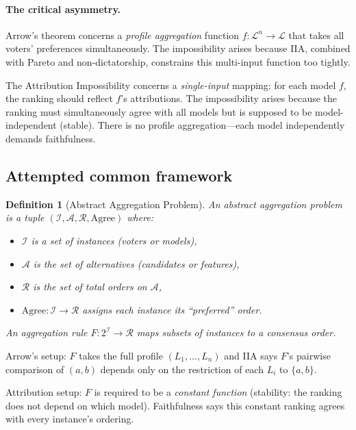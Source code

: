 \documentclass{article}
\newtheorem{definition}[theorem]{Definition}
\begin{document}
\paragraph{The critical asymmetry.}
Arrow's theorem concerns a \emph{profile aggregation} function
$f \colon \mathcal{L}^n \to \mathcal{L}$ that takes all voters'
preferences simultaneously. The impossibility arises because IIA,
combined with Pareto and non-dictatorship, constrains this multi-input
function too tightly.

The Attribution Impossibility concerns a \emph{single-input} mapping:
for each model $f$, the ranking should reflect $f$'s attributions.
The impossibility arises because the ranking must simultaneously
agree with all models but is supposed to be model-independent (stable).
There is no profile aggregation---each model independently demands
faithfulness.

\subsection{Attempted common framework}

\begin{definition}[Abstract Aggregation Problem]
An \emph{abstract aggregation problem} is a tuple
$(\mathcal{I}, \mathcal{A}, \mathcal{R}, \text{Agree})$ where:
\begin{itemize}
    \item $\mathcal{I}$ is a set of \emph{instances} (voters or models),
    \item $\mathcal{A}$ is the set of alternatives (candidates or features),
    \item $\mathcal{R}$ is the set of total orders on $\mathcal{A}$,
    \item $\text{Agree} \colon \mathcal{I} \to \mathcal{R}$ assigns each
      instance its ``preferred'' order.
\end{itemize}
An \emph{aggregation rule} $F \colon 2^{\mathcal{I}} \to \mathcal{R}$
maps subsets of instances to a consensus order.
\end{definition}

Arrow's setup: $F$ takes the full profile $(L_1, \ldots, L_n)$ and
IIA says $F$'s pairwise comparison of $(a,b)$ depends only on the
restriction of each $L_i$ to $\{a,b\}$.

Attribution setup: $F$ is required to be a \emph{constant function}
(stability: the ranking does not depend on which model). Faithfulness
says this constant ranking agrees with every instance's ordering.
\end{document}
